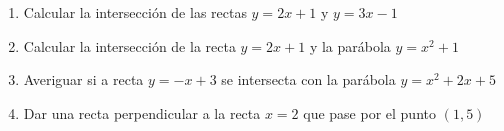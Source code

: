 \documentclass[a4paper]{article}
\begin{document}
\begin{enumerate}
\begin{enumerate} [label=(\alph*)]
		\item Calcular la intersección de las rectas $y=2x+1$ y $y=3x-1$

		\item Calcular la intersección de la recta $y=2x+1$ y la parábola $y=x^2+1$

		\item Averiguar si a recta $y=-x+3$ se intersecta con la parábola $y=x^2+2x+5$
	
		\item Dar una recta perpendicular a la recta $x=2$ que pase por el punto $(1,5)$
	\end{enumerate}

\end{enumerate}
\end{document}
